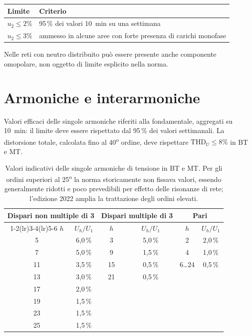 \begin{center}
\begin{tabular}{ll}
\toprule
\textbf{Limite} & \textbf{Criterio} \\
\midrule
$u_2 \le 2\%$ & 95\,\% dei valori \SI{10}{\minute} su una settimana \\
$u_2 \le 3\%$ & ammesso in alcune aree con forte presenza di carichi monofase \\
\bottomrule
\end{tabular}
\end{center}

\noindent
Nelle reti con neutro distribuito può essere presente anche componente omopolare,
non oggetto di limite esplicito nella norma.

\section{Armoniche e interarmoniche}

Valori efficaci delle singole armoniche riferiti alla fondamentale, aggregati su
\SI{10}{\minute}: il limite deve essere rispettato dal 95\,\% dei valori settimanali.
La distorsione totale, calcolata fino al 40\textsuperscript{o} ordine, deve rispettare
$\mathrm{THD}_U \le 8\%$ in BT e MT.

\begin{table}[h]
\centering
\small
\begin{tabular}{cc cc cc}
\toprule
\multicolumn{2}{c}{\textbf{Dispari non multiple di 3}} &
\multicolumn{2}{c}{\textbf{Dispari multiple di 3}} &
\multicolumn{2}{c}{\textbf{Pari}} \\
\cmidrule(lr){1-2}\cmidrule(lr){3-4}\cmidrule(lr){5-6}
$h$ & $U_h/U_1$ & $h$ & $U_h/U_1$ & $h$ & $U_h/U_1$ \\
\midrule
5  & 6,0\,\%  & 3  & 5,0\,\%  & 2         & 2,0\,\% \\
7  & 5,0\,\%  & 9  & 1,5\,\%  & 4         & 1,0\,\% \\
11 & 3,5\,\%  & 15 & 0,5\,\%  & 6\dots24  & 0,5\,\% \\
13 & 3,0\,\%  & 21 & 0,5\,\%  &           &         \\
17 & 2,0\,\%  &    &          &           &         \\
19 & 1,5\,\%  &    &          &           &         \\
23 & 1,5\,\%  &    &          &           &         \\
25 & 1,5\,\%  &    &          &           &         \\
\bottomrule
\end{tabular}
\caption*{\small Valori indicativi delle singole armoniche di tensione in BT e MT.
Per gli ordini superiori al 25\textsuperscript{o} la norma storicamente non fissava
valori, essendo generalmente ridotti e poco prevedibili per effetto delle risonanze
di rete; l'edizione 2022 amplia la trattazione degli ordini elevati.}
\end{table}

